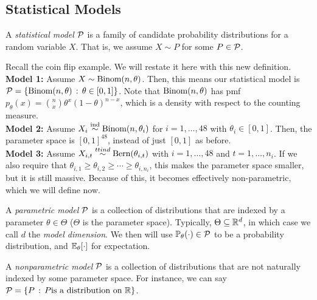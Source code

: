 \subsection*{Statistical Models}

\begin{definition}
    A \emph{statistical model} $\cal{P}$ is a family of candidate probability distributions for a random variable $X$. That is, we assume $X \sim P$ for some $P \in \cal{P}$. 
\end{definition}

Recall the coin flip example. We will restate it here with this new definition.\\

\textbf{Model 1:} Assume $X \sim \tt{Binom}(n, \theta)$. Then, this means our statistical model is $\cal{P} = \{\tt{Binom}(n, \theta) \col \theta \in [0, 1]\}$. Note that $\tt{Binom}(n, \theta)$ has pmf $p_{\theta}(x) = {n \choose x} \theta^{x}(1 - \theta)^{n - x}$, which is a density with respect to the counting measure.\\

\textbf{Model 2:} Assume $X_i \overset{\tt{ind}}{\sim} \tt{Binom}(n, \theta_i)$ for $i = 1, \ldots, 48$ with $\theta_i \in [0, 1]$. Then, the parameter space is $[0, 1]^{48}$, instead of just $[0, 1]$ as before.\\

\textbf{Model 3:} Assume $X_{i, t} \overset{tt{ind}}{\sim} \tt{Bern}(\theta_{i, t})$ with $i = 1, \ldots, 48$ and $t = 1, \ldots, n_{i}$. If we also require that $\theta_{i, 1} \geq \theta_{i, 2} \geq \cdots \geq \theta_{i, n_{i}}$, this makes the parameter space smaller, but it is still massive. Because of this, it becomes effectively non-parametric, which we will define now.\\

\begin{definition}
    A \emph{parametric model} $\cal{P}$ is a collection of distributions that are indexed by a parameter $\theta \in \Theta$ ($\Theta$ is the parameter space). Typically, $\Theta \subseteq \R^{d}$, in which case we call $d$ the \emph{model dimension}. We then will use $\bb{P}_{\theta}( \cdot ) \in \cal{P}$ to be a probability distribution, and $\bb{E}_{\theta}[ \cdot ]$ for expectation.
\end{definition}

\begin{definition}
    A \emph{nonparametric model} $\cal{P}$ is a collection of distributions that are not naturally indexed by some parameter space. For instance, we can say $\cal{P} = \{P \col P \tt{is a distribution on } \R\}$. 
\end{definition}

